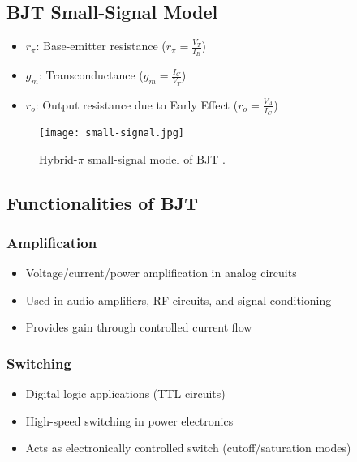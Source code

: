 \documentclass[conference]{IEEEtran}
\begin{document}
\subsection{BJT Small-Signal Model}
\begin{itemize}
    \item $r_{\pi}$: Base-emitter resistance ($r_{\pi} = \frac{V_T}{I_B}$) \cite{b2}
    \item $g_m$: Transconductance ($g_m = \frac{I_C}{V_T}$)
    \item $r_o$: Output resistance due to Early Effect ($r_o = \frac{V_A}{I_C}$) \cite{b1}
\end{itemize}

\begin{figure}[htbp]
\centering
\texttt{[image: small-signal.jpg]}
\caption{Hybrid-$\pi$ small-signal model of BJT \cite{b2}.}
\label{fig1}
\end{figure}

\subsection{Functionalities of BJT}

\subsubsection{Amplification}
\begin{itemize}
    \item Voltage/current/power amplification in analog circuits
    \item Used in audio amplifiers, RF circuits, and signal conditioning
    \item Provides gain through controlled current flow
\end{itemize}

\subsubsection{Switching}
\begin{itemize}
    \item Digital logic applications (TTL circuits)
    \item High-speed switching in power electronics
    \item Acts as electronically controlled switch (cutoff/saturation modes)
\end{itemize}
\end{document}
